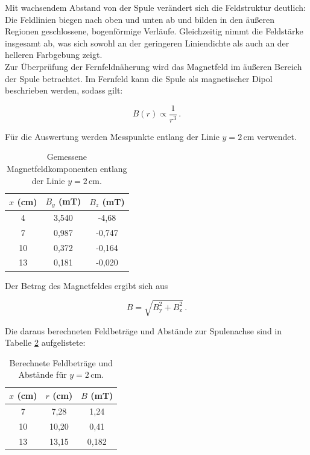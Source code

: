Mit wachsendem Abstand von der Spule verändert sich die Feldstruktur deutlich: Die Feldlinien biegen nach oben und unten ab und bilden in den äußeren Regionen geschlossene, bogenförmige Verläufe. Gleichzeitig nimmt die Feldstärke insgesamt ab, was sich sowohl an der geringeren Liniendichte als auch an der helleren Farbgebung zeigt. \\
Zur Überprüfung der Fernfeldnäherung wird das Magnetfeld im äußeren Bereich der Spule betrachtet. Im Fernfeld kann die Spule als magnetischer Dipol beschrieben werden, sodass gilt:

\begin{equation}
B(r) \propto \frac{1}{r^3}\,. \label{eq:Fernfeld}
\end{equation}

\noindent Für die Auswertung werden Messpunkte entlang der Linie $y = 2\,\mathrm{cm}$ verwendet. 

\begin{table}[h]
\centering
\begin{tabular}{c c c}
\hline
$x$ (cm) & $B_y$ (mT) & $B_z$ (mT) \\
\hline
4  & 3{,}540 & -4{,}68 \\
7  & 0{,}987 & -0{,}747 \\
10 & 0{,}372 & -0{,}164 \\
13 & 0{,}181 & -0{,}020 \\
\hline
\end{tabular}
\caption{Gemessene Magnetfeldkomponenten entlang der Linie $y=2\,\mathrm{cm}$.}
\label{tab:y2_daten}
\end{table}

\noindent Der Betrag des Magnetfeldes ergibt sich aus

\begin{equation}
B = \sqrt{B_\text{y}^2 + B_\text{z}^2}\,.
\end{equation}

\noindent Die daraus berechneten Feldbeträge und Abstände zur Spulenachse sind in Tabelle \ref{tab:betraege} aufgelistete:

\begin{table}[h]
\centering
\begin{tabular}{c c c}
\hline
$x$ (cm) & $r$ (cm) & $B$ (mT) \\
\hline
7  & 7{,}28  & 1{,}24 \\
10 & 10{,}20 & 0{,}41 \\
13 & 13{,}15 & 0{,}182 \\
\hline
\end{tabular}
\caption{Berechnete Feldbeträge und Abstände für $y=2\,\mathrm{cm}$.}
\label{tab:betraege}
\end{table}

